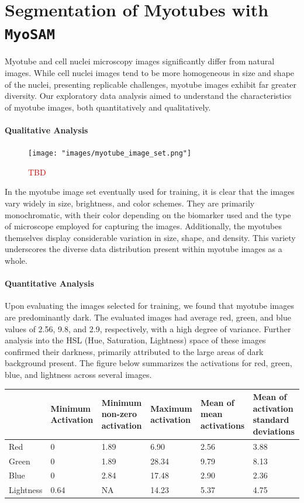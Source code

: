 \section{Segmentation of Myotubes with \texttt{MyoSAM}}\label{secsam}

Myotube and cell nuclei microscopy images significantly differ from natural images. While cell nuclei images tend to be more homogeneous in size and shape of the nuclei, presenting replicable challenges, myotube images exhibit far greater diversity. Our exploratory data analysis aimed to understand the characteristics of myotube images, both quantitatively and qualitatively.

\paragraph{Qualitative Analysis}
\begin{figure}
	\centering
	\texttt{[image: "images/myotube\_image\_set.png"]}
	\caption[TBD]{\textcolor{red}{TBD}}
	\label{fig1}
\end{figure}
In the myotube image set eventually used for training, it is clear that the images vary widely in size, brightness, and color schemes. They are primarily monochromatic, with their color depending on the biomarker used and the type of microscope employed for capturing the images. Additionally, the myotubes themselves display considerable variation in size, shape, and density. This variety underscores the diverse data distribution present within myotube images as a whole.

\paragraph{Quantitative Analysis}
Upon evaluating the images selected for training, we found that myotube images are predominantly dark. The evaluated images had average red, green, and blue values of 2.56, 9.8, and 2.9, respectively, with a high degree of variance. Further analysis into the HSL (Hue, Saturation, Lightness) space of these images confirmed their darkness, primarily attributed to the large areas of dark background present. The figure below summarizes the activations for red, green, blue, and lightness across several images.

\begin{tabular}{|p{2cm}|p{2cm}|p{2cm}|p{2cm}|p{2cm}|p{2cm}|}
	\hline
	& Minimum Activation & Minimum non-zero  activation & Maximum activation & Mean of mean activations & Mean of activation standard deviations \\
	\hline
	Red & 0 & 1.89 & 6.90 & 2.56 & 3.88 \\
	\hline
	Green & 0 & 1.89 & 28.34 & 9.79 & 8.13 \\
	\hline
	Blue & 0 & 2.84 & 17.48 & 2.90 & 2.36 \\
	\hline
	Lightness & 0.64 & NA & 14.23 & 5.37 & 4.75 \\
	\hline
\end{tabular}

